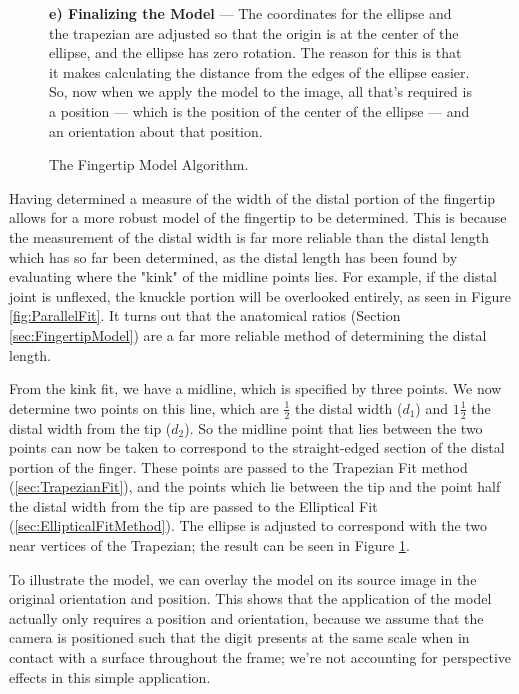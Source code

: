 \begin{figure}[p!]
    \begin{minipage}{0.95\textwidth}
         \textbf{e) Finalizing the Model} --- The coordinates for the ellipse and the trapezian are adjusted so that the origin is at the center of the ellipse, and the ellipse has zero rotation. The reason for this is that it makes calculating the distance from the edges of the ellipse easier. So, now when we apply the model to the image, all that's required is a position --- which is the position of the center of the ellipse --- and an orientation about that position. 
    \end{minipage}
    \caption{The Fingertip Model Algorithm.}\label{fig:ModelingFingertip}
\end{figure}

Having determined a measure of the width of the distal portion of the fingertip allows for a more robust model of the fingertip to be determined. This is because the measurement of the distal width is far more reliable than the distal length which has so far been determined, as the distal length has been found by evaluating where the "kink" of the midline points lies. For example, if the distal joint is unflexed, the knuckle portion will be overlooked entirely, as seen in Figure \ref{fig:ParallelFit}. It turns out that the anatomical ratios (Section \ref{sec:FingertipModel}) are a far more reliable method of determining the distal length.

From the kink fit, we have a midline, which is specified by three points. We now determine two points on this line, which are $\frac{1}{2}$ the distal width ($d_1$) and $1\frac{1}{2}$ the distal width from the tip ($d_2$). So the midline point that lies between the two points can now be taken to correspond to the straight-edged section of the distal portion of the finger. These points are passed to the Trapezian Fit method (\ref{sec:TrapezianFit}), and the points which lie between the tip and the point half the distal width from the tip are passed to the Elliptical Fit (\ref{sec:EllipticalFitMethod}). The ellipse is adjusted to correspond with the two near vertices of the Trapezian; the result can be seen in Figure \ref{fig:ModelingFingertip}.

To illustrate the model, we can overlay the model on its source image in the original orientation and position. This shows that the application of the model actually only requires a position and orientation, because we assume that the camera is positioned such that the digit presents at the same scale when in contact with a surface throughout the frame; we're not accounting for perspective effects in this simple application.

